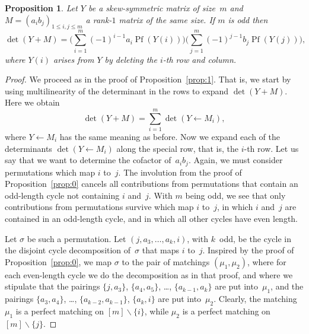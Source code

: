 \documentclass[12pt,reqno]{amsart}
\numberwithin{equation}{section}
\newtheorem{proposition}[theorem]{Proposition}
\theoremstyle{definition}
\theoremstyle{remark}
\newtheorem{remark}[theorem]{Remark}
\def\Pf{\operatorname{Pf}}
\def\si{\sigma}
\begin{document}

\begin{proposition} \label{prop:2}
Let $Y$ be a skew-symmetric matrix of size~$m$ and
$M=(a_ib_j)_{1\le i,j\le m}$ a rank-$1$ matrix of the same size.
If $m$ is odd then 
\begin{equation} \label{eq:5} 
\det(Y+M)=\Bigg(
\sum_{i=1}^m(-1)^{i-1}a_i
\Pf(Y(i))\Bigg)\Bigg(
\sum_{j=1}^m(-1)^{j-1}b_j
\Pf(Y(j))\Bigg),
\end{equation}
where $Y(i)$ arises from $Y$ by deleting the $i$-th 
row and column.
\end{proposition}

\begin{proof}
We proceed as in the proof of Proposition~\ref{prop:1}. That is,
we start by using multilinearity of the determinant in the rows to expand
$\det(Y+M)$. Here we obtain
$$
\det(Y+M)=\sum_{i=1}^{m}\det(Y\leftarrow M_i),
$$
where $Y\leftarrow M_i$ has the same meaning as before.
Now we expand each of the determinants $\det(Y\leftarrow M_i)$
along the special row, that is, the $i$-th row.
Let us say
that we want to determine the cofactor of~$a_ib_j$. 
Again, we must consider permutations
which map $i$ to~$j$. The involution from the proof of
Proposition~\ref{prop:0} cancels all
contributions from permutations that contain an odd-length cycle not
containing $i$ and~$j$. With $m$ being odd, we see that
only contributions from permutations survive 
which map $i$ to~$j$, in which $i$ and~$j$ are contained in an
odd-length cycle, and in which all other cycles have even length.

Let $\si$ be such a permutation. Let
$(j,a_3,\dots,a_k,i)$, with $k$~odd, be the cycle in the disjoint
cycle decomposition of~$\si$ that maps $i$ to~$j$.
Inspired by the proof of Proposition~\ref{prop:0}, we map $\si$
to the pair of matchings $(\mu_1,\mu_2)$, where for each even-length
cycle we do the decomposition as in that proof, and where we
stipulate that the pairings $\{j,a_3\}$, $\{a_4,a_5\}$, \dots,
$\{a_{k-1},a_k\}$ are put into~$\mu_1$, and
the pairings $\{a_3,a_4\}$, \dots, $\{a_{k-2},a_{k-1}\}$, 
$\{a_{k},i\}$ are put into~$\mu_2$. Clearly, the matching~$\mu_1$
is a perfect matching on $[m]\backslash\{i\}$, while $\mu_2$
is a perfect matching on $[m]\backslash\{j\}$.


\end{proof}
\end{document}
